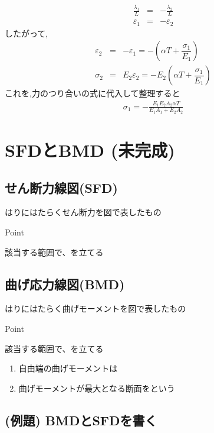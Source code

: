 \documentclass[a4paper]{jsarticle}
\begin{document}
\begin{enumerate}[(1)]
          \begin{eqnarray*}
              \frac{\lambda_1}{L}&=&-\frac{\lambda_2}{L}\\
              \varepsilon_1&=&-\varepsilon_2
          \end{eqnarray*}
          したがって,
          \begin{eqnarray*}
              \varepsilon_2&=&-\varepsilon_1=-\left(\alpha T+\dfrac{\sigma_1}{E_1}\right)\\
              \sigma_2&=&E_2\varepsilon_2=-E_2\left(\alpha T+\dfrac{\sigma_1}{E_1}\right)
          \end{eqnarray*}
          これを,力のつり合いの式に代入して整理すると
          \begin{eqnarray*}
              \sigma_1=-\frac{E_1E_2A_2\alpha T}{E_1A_1+E_2A_2}
          \end{eqnarray*}
\end{enumerate}
\section{SFDとBMD (未完成)}
\subsection{せん断力線図(SFD)}
はりにはたらくせん断力を図で表したもの
\begin{itembox}[l]{Point}
    \begin{center}
        該当する範囲で、を立てる
    \end{center}
\end{itembox}
\subsection{曲げ応力線図(BMD)}
はりにはたらく曲げモーメントを図で表したもの
\begin{itembox}[l]{Point}
    \begin{center}
        該当する範囲で、を立てる
    \end{center}
\end{itembox}
\begin{enumerate}[(1)]
    \item 自由端の曲げモーメントは
    \item 曲げモーメントが最大となる断面をという
\end{enumerate}
\subsection{(例題) BMDとSFDを書く}
\end{document}

